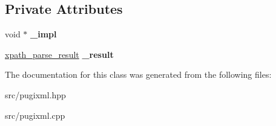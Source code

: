 \subsection*{Private Attributes}
\begin{DoxyCompactItemize}
\item 
\mbox{\label{classpugi_1_1xpath__query_af757e052550be2214d52aab24f395123}} 
void $\ast$ {\bfseries \+\_\+impl}
\item 
\mbox{\label{classpugi_1_1xpath__query_a7024aa589e9f068dd68b4fdfef0a5043}} 
\hyperlink{structpugi_1_1xpath__parse__result}{xpath\+\_\+parse\+\_\+result} {\bfseries \+\_\+result}
\end{DoxyCompactItemize}


The documentation for this class was generated from the following files\+:\begin{DoxyCompactItemize}
\item 
src/pugixml.\+hpp\item 
src/pugixml.\+cpp\end{DoxyCompactItemize}
